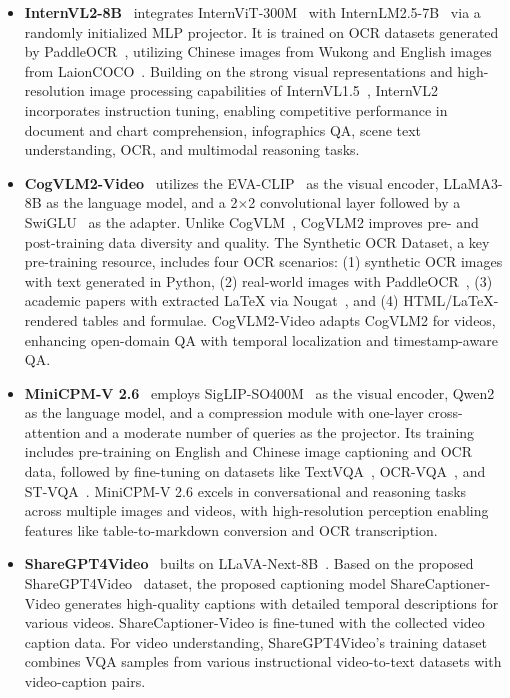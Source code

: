 \begin{itemize}
    \item \textbf{InternVL2-8B}~\cite{chen2024far} integrates InternViT-300M~\cite{chen2024internvl} with InternLM2.5-7B~\cite{cai2024internlm2} via a randomly initialized MLP projector. It is trained on OCR datasets generated by PaddleOCR~\cite{li2022pp}, utilizing Chinese images from Wukong and English images from LaionCOCO~\cite{schuhmann2021laion}. Building on the strong visual representations and high-resolution image processing capabilities of InternVL1.5~\cite{chen2024far}, InternVL2 incorporates instruction tuning, enabling competitive performance in document and chart comprehension, infographics QA, scene text understanding, OCR, and multimodal reasoning tasks.
    \item \textbf{CogVLM2-Video}~\cite{hong2024cogvlm2} utilizes the EVA-CLIP~\cite{sun2023eva} as the visual encoder, LLaMA3-8B as the language model, and a 2$\times$2 convolutional layer followed by a SwiGLU~\cite{shazeer2020glu} as the adapter. Unlike CogVLM~\cite{wang2023cogvlm}, CogVLM2 improves pre- and post-training data diversity and quality. The Synthetic OCR Dataset, a key pre-training resource, includes four OCR scenarios: (1) synthetic OCR images with text generated in Python, (2) real-world images with PaddleOCR~\cite{li2022pp}, (3) academic papers with extracted LaTeX via Nougat~\cite{blecher2023nougat}, and (4) HTML/LaTeX-rendered tables and formulae. CogVLM2-Video adapts CogVLM2 for videos, enhancing open-domain QA with temporal localization and timestamp-aware QA.
    \item \textbf{MiniCPM-V 2.6}~\cite{yao2024minicpm} employs SigLIP-SO400M~\cite{zhai2023sigmoid} as the visual encoder, Qwen2~\cite{wang2024qwen2} as the language model, and a compression module with one-layer cross-attention and a moderate number of queries as the projector. Its training includes pre-training on English and Chinese image captioning and OCR data, followed by fine-tuning on datasets like TextVQA~\cite{singh2019towards}, OCR-VQA~\cite{mishra2019ocr}, and ST-VQA~\cite{biten2019scene}. MiniCPM-V 2.6 excels in conversational and reasoning tasks across multiple images and videos, with high-resolution perception enabling features like table-to-markdown conversion and OCR transcription.
    \item \textbf{ShareGPT4Video}~\cite{chen2024sharegpt4video} builts on LLaVA-Next-8B~\cite{li2024llava}. Based on the proposed ShareGPT4Video~\cite{chen2024sharegpt4video} dataset, the proposed captioning model ShareCaptioner-Video generates high-quality captions with detailed temporal descriptions for various videos. ShareCaptioner-Video is fine-tuned with the collected video caption data. For video understanding, ShareGPT4Video's training dataset combines VQA samples from various instructional video-to-text datasets with video-caption pairs.
\end{itemize}



